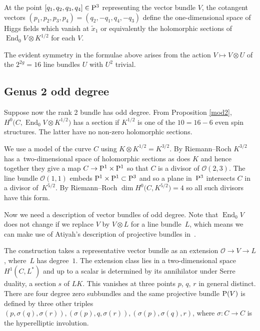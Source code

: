 \documentclass[pdftex]{sigma}
\def\End{\operatorname{End}}
\newcommand{\PP}{{\rm P}}
\newcommand{\OO}{{\mathcal O}}
\begin{document}
\begin{proposition} At the point $[q_1,q_2,q_3,q_4]\in \PP^3$ representing the vector bundle $V$, the cotangent vectors $(p_1,p_2,p_3,p_4)=(q_2, -q_1, q_4, -q_3)$
define the one-dimensional space of Higgs fields which vanish at $\tilde x_1$ or equivalently the holomorphic sections of $\End_0V\otimes K^{1/2}$ for each $V$.
\end{proposition}
\begin{remark} The evident symmetry in the formulae above arises from the action $V\mapsto V\otimes U$ of the $2^{2g}=16$ line bundles $U$ with $U^2$ trivial.
\end{remark}
\subsection{Genus 2 odd degree}\label{section4.3}
Suppose now the rank 2 bundle has odd degree. From Proposition \ref{mod2}, $H^0\big(C,\End_0V\otimes K^{1/2}\big)$ has a section if $K^{1/2}$ is one of the $10 =16 - 6$ even spin structures. The latter have no non-zero holomorphic sections.

We use a model of the curve $C$ using $K\otimes K^{1/2}=K^{3/2}$. By Riemann--Roch $K^{3/2}$ has a~two-dimensional space of holomorphic sections as does $K$ and hence together they give a map $C\rightarrow \PP^1\times \PP^1$ so that $C$ is a divisor of $\OO(2,3)$. The line bundle $\OO(1,1)$ embeds $\PP^1\times \PP^1\subset \PP^3$ and so a plane in~$\PP^3$ intersects $C$ in a divisor of~$K^{5/2}$. By Riemann--Roch $\dim H^0\big(C,K^{5/2}\big)=4$ so all such divisors have this form.

Now we need a description of vector bundles of odd degree. Note that $\End_0V$ does not change if we replace $V$ by $V\otimes L$ for a line bundle~$L$, which means we can make use of Atiyah's description of projective bundles in~\cite{Atiyah}.

The construction takes a representative vector bundle as an extension $\OO\rightarrow V\rightarrow L$, where~$L$ has degree~$1$. The extension class lies in a two-dimensional space $H^1(C,L^*)$ and up to a scalar is determined by its annihilator under Serre duality, a section $s$ of $LK$. This vanishes at three points $p$, $q$, $r$ in general distinct. There are four degree zero subbundles and the same projective bundle $\PP(V)$ is defined by three other triples $(p, \sigma(q),\sigma(r)),(\sigma(p),q,\sigma(r)), (\sigma(p),\sigma(q),r)$, where $\sigma\colon C\rightarrow C$ is the hyperelliptic involution.
\end{document}
